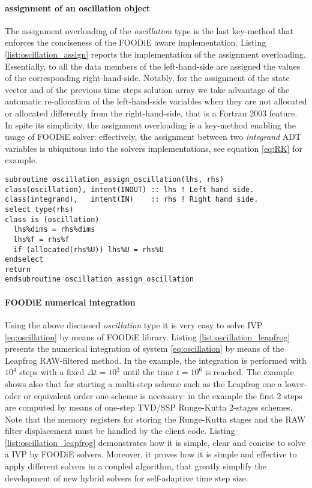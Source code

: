\documentclass[pdftex,preprint,3p,times,numbers]{elsarticle}
\begin{document}
\paragraph{assignment of an oscillation object}

The assignment overloading of the \emph{oscillation} type is the last key-method that enforces the conciseness of the FOODiE aware implementation. Listing \ref{list:oscillation_assign} reports the implementation of the assignment overloading. Essentially, to all the data members of the left-hand-side are assigned the values of the corresponding right-hand-side. Notably, for the assignment of the state vector and of the previous time steps solution array we take advantage of the automatic re-allocation of the left-hand-side variables when they are not allocated or allocated differently from the right-hand-side, that is a Fortran 2003 feature. In spite its simplicity, the assignment overloading is a key-method enabling the usage of FOODiE solver: effectively, the assignment between two \emph{integrand} ADT variables is ubiquitous into the solvers implementations, see equation \ref{eq:RK} for example.

\begin{lstlisting}[firstnumber=1,style=code,caption={implementation of the \emph{oscillation integrand} assignment},label={list:oscillation_assign}]
subroutine oscillation_assign_oscillation(lhs, rhs)
class(oscillation), intent(INOUT) :: lhs ! Left hand side.
class(integrand),   intent(IN)    :: rhs ! Right hand side.
select type(rhs)
class is (oscillation)
  lhs%dims = rhs%dims
  lhs%f = rhs%f
  if (allocated(rhs%U)) lhs%U = rhs%U
endselect
return
endsubroutine oscillation_assign_oscillation
\end{lstlisting}

\paragraph{FOODiE numerical integration}

Using the above discussed \emph{oscillation} type it is very easy to solve IVP \ref{eq:oscillation} by means of FOODiE library. Listing \ref{list:oscillation_leapfrog} presents the numerical integration of system \ref{eq:oscillation} by means of the Leapfrog RAW-filtered method. In the example, the integration is performed with $10^4$ steps with a fixed $\Delta t=10^2$ until the time $t=10^6$ is reached. The example shows also that for starting a multi-step scheme such as the Leapfrog one a lower-oder or equivalent order one-scheme is necessary: in the example the first 2 steps are computed by means of one-step TVD/SSP Runge-Kutta 2-stages schemes. Note that the memory registers for storing the Runge-Kutta stages and the RAW filter displacement must be handled by the client code. Listing \ref{list:oscillation_leapfrog} demonstrates how it is simple, clear and concise to solve a IVP by FOODiE solvers. Moreover, it proves how it is simple and effective to apply different solvers in a coupled algorithm, that greatly simplify the development of new hybrid solvers for self-adaptive time step size.
\end{document}
